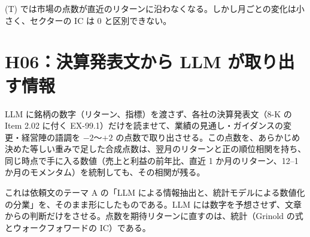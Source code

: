 \documentclass[xelatex,ja=standard,jafont=haranoaji,a4paper,10pt,openany]{bxjsreport}
\begin{document}
\begin{predbox}
(T) では市場の点数が直近のリターンに沿わなくなる。しかし月ごとの変化は小さく、セクターの IC は 0 と区別できない。
\end{predbox}

\chapter{H06：決算発表文から LLM が取り出す情報}\label{ch:h06}

\begin{hypbox}
LLM に銘柄の数字（リターン、指標）を渡さず、各社の決算発表文（8-K の Item 2.02 に付く EX-99.1）だけを読ませて、業績の見通し・ガイダンスの変更・経営陣の語調を $-2$〜$+2$ の点数で取り出させる。この点数を、あらかじめ決めた等しい重みで足した合成点数は、翌月のリターンと正の順位相関を持ち、同じ時点で手に入る数値（売上と利益の前年比、直近 1 か月のリターン、12--1 か月のモメンタム）を統制しても、その相関が残る。
\end{hypbox}

これは依頼文のテーマ A の「LLM による情報抽出と、統計モデルによる数値化の分業」を、そのまま形にしたものである。LLM には数字を予想させず、文章からの判断だけをさせる。点数を期待リターンに直すのは、統計（Grinold の式とウォークフォワードの IC）である。
\end{document}

